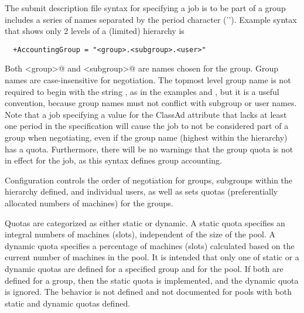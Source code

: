The submit description file syntax for specifying a job is to be
part of a group includes 
a series of names separated by the period character ('').
Example syntax that shows only 2 levels of a (limited) hierarchy is
\begin{verbatim}
  +AccountingGroup = "<group>.<subgroup>.<user>"
\end{verbatim}
Both \verb@<group>@ and \verb@<subgroup>@ are names chosen for the group.
Group names are case-insensitive for negotiation.
The topmost level group name is not required to begin with the
string ,
as in the examples
 and ,
but it is a useful convention,
because group names must not conflict with subgroup or user names.
Note that a job specifying a value for the 
ClassAd attribute that lacks at least one period in the specification
will cause the job to not be considered part of a
group when negotiating, even if the group name 
(highest within the hierarchy) has a quota.
Furthermore, there will be no warnings that the group quota is not
in effect for the job, as this syntax defines group accounting.

Configuration controls the order of negotiation for
groups, subgroups within the hierarchy defined, and individual users,
as well as sets quotas
(preferentially allocated numbers of machines)
for the groups.

Quotas are categorized as either static or dynamic.
A static quota specifies an integral numbers of machines (slots),
independent of the size of the pool.
A dynamic quota specifies a percentage of machines (slots) calculated
based on the current number of machines in the pool.
It is intended that only one of static or a dynamic quotas are defined 
for a specified group and for the pool.
If both are defined for a group, then the static quota is implemented, 
and the dynamic quota is ignored.
The behavior is not defined and not documented
for pools with both static and dynamic quotas defined.

